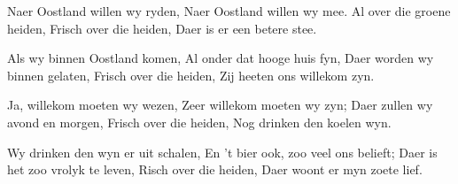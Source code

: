 \beginverse
Naer Oostland willen wy ryden,
Naer Oostland willen wy mee.
Al over die groene heiden,
Frisch over die heiden,
Daer is er een betere stee.
\endverse

\beginverse
Als wy binnen Oostland komen,
Al onder dat hooge huis fyn,
Daer worden wy binnen gelaten,
Frisch over die heiden,
Zij heeten ons willekom zyn.
\endverse

\beginverse
Ja, willekom moeten wy wezen,
Zeer willekom moeten wy zyn;
Daer zullen wy avond en morgen,
Frisch over die heiden,
Nog drinken den koelen wyn.
\endverse

\beginverse
Wy drinken den wyn er uit schalen,
En 't bier ook, zoo veel ons belieft;
Daer is het zoo vrolyk te leven,
Risch over die heiden,
Daer woont er myn zoete lief.
\endverse
\endsong